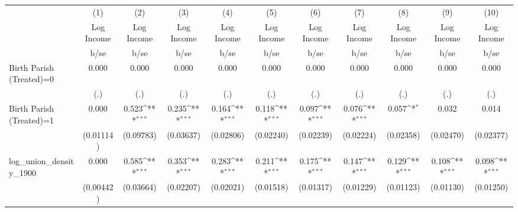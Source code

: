 {
\def\sym#1{\ifmmode^{#1}\else\(^{#1}\)\fi}
\begin{tabular}{l*{10}{c}}
\hline\hline
                    &\multicolumn{1}{c}{(1)}&\multicolumn{1}{c}{(2)}&\multicolumn{1}{c}{(3)}&\multicolumn{1}{c}{(4)}&\multicolumn{1}{c}{(5)}&\multicolumn{1}{c}{(6)}&\multicolumn{1}{c}{(7)}&\multicolumn{1}{c}{(8)}&\multicolumn{1}{c}{(9)}&\multicolumn{1}{c}{(10)}\\
                    &\multicolumn{1}{c}{Log Income}&\multicolumn{1}{c}{Log Income}&\multicolumn{1}{c}{Log Income}&\multicolumn{1}{c}{Log Income}&\multicolumn{1}{c}{Log Income}&\multicolumn{1}{c}{Log Income}&\multicolumn{1}{c}{Log Income}&\multicolumn{1}{c}{Log Income}&\multicolumn{1}{c}{Log Income}&\multicolumn{1}{c}{Log Income}\\
                    &        b/se         &        b/se         &        b/se         &        b/se         &        b/se         &        b/se         &        b/se         &        b/se         &        b/se         &        b/se         \\
\hline
Birth Parish (Treated)=0&       0.000         &       0.000         &       0.000         &       0.000         &       0.000         &       0.000         &       0.000         &       0.000         &       0.000         &       0.000         \\
                    &         (.)         &         (.)         &         (.)         &         (.)         &         (.)         &         (.)         &         (.)         &         (.)         &         (.)         &         (.)         \\
Birth Parish (Treated)=1&       0.000         &       0.523\sym{***}&       0.235\sym{***}&       0.164\sym{***}&       0.118\sym{***}&       0.097\sym{***}&       0.076\sym{***}&       0.057\sym{*}  &       0.032         &       0.014         \\
                    &   (0.01114)         &   (0.09783)         &   (0.03637)         &   (0.02806)         &   (0.02240)         &   (0.02239)         &   (0.02224)         &   (0.02358)         &   (0.02470)         &   (0.02377)         \\
log\_union\_density\_1900&       0.000         &       0.585\sym{***}&       0.353\sym{***}&       0.283\sym{***}&       0.211\sym{***}&       0.175\sym{***}&       0.147\sym{***}&       0.129\sym{***}&       0.108\sym{***}&       0.098\sym{***}\\
                    &   (0.00442)         &   (0.03664)         &   (0.02207)         &   (0.02021)         &   (0.01518)         &   (0.01317)         &   (0.01229)         &   (0.01123)         &   (0.01130)         &   (0.01250)         \\

\end{tabular}}
